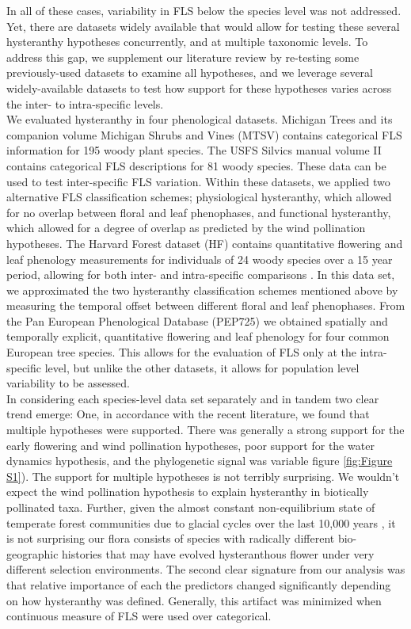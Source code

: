 \documentclass[12pt]{article}\usepackage[]{graphicx}\usepackage[]{color}
\begin{document}
\indent In all of these cases, variability in FLS below the species level was not addressed. Yet, there are datasets widely available that would allow for testing these several hysteranthy hypotheses concurrently, and at multiple taxonomic levels. To address this gap, we supplement our literature review by re-testing some previously-used datasets to examine all hypotheses, and we leverage several widely-available datasets to test how support for these hypotheses varies across the inter- to intra-specific levels.\\ 
\indent We evaluated hysteranthy in four phenological datasets. Michigan Trees and its companion volume Michigan Shrubs and Vines \citep{Barnes2004,Barnes2016} (MTSV) contains categorical FLS information for 195 woody plant species. The USFS Silvics manual volume II \citep{Burns1990} contains categorical FLS descriptions for 81 woody species. These data can be used to test inter-specific FLS variation. Within these datasets, we applied two alternative FLS classification schemes; physiological hysteranthy, which allowed for no overlap between floral and leaf phenophases, and functional hysteranthy, which allowed for a degree of overlap as predicted by the wind pollination hypotheses. The Harvard Forest dataset (HF) contains quantitative flowering and leaf phenology measurements for individuals of 24 woody species over a 15 year period, allowing for both inter- and intra-specific comparisons \citep{OKeefe2015}. In this data set, we approximated the two hysteranthy classification schemes mentioned above by measuring the temporal offset between different floral and leaf phenophases. From the Pan European Phenological Database (PEP725) \citep{PEP725} we obtained spatially and temporally explicit, quantitative flowering and leaf phenology for four common European tree species. This allows for the evaluation of FLS only at the intra-specific level, but unlike the other datasets, it allows for population level variability to be assessed.\\
\indent In considering each species-level data set separately and in tandem two clear trend emerge: One, in accordance with the recent literature, we found that multiple hypotheses were supported. There was generally a strong support for the early flowering and wind pollination hypotheses, poor support for the water dynamics hypothesis, and the phylogenetic signal was variable figure \ref{fig:Figure S1}). The support for multiple hypotheses is not terribly surprising. We wouldn't expect the wind pollination hypothesis to explain hysteranthy in biotically pollinated taxa. Further, given the almost constant non-equilibrium state of temperate forest communities due to glacial cycles over the last 10,000 years \citep{Spurr1980}, it is not surprising our flora consists of species with radically different bio-geographic histories that may have evolved hysteranthous flower under very different selection environments. The second clear signature from our analysis was that relative importance of each the predictors changed significantly depending on how hysteranthy was defined. Generally, this artifact was minimized when continuous measure of FLS were used over categorical.\\
\end{document}
